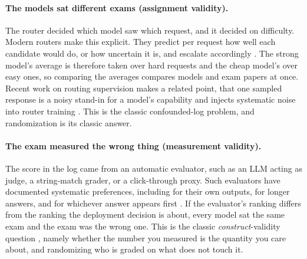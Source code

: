 \documentclass{article}
\theoremstyle{plain}
\theoremstyle{remark}
\begin{document}
\paragraph{The models sat different exams (assignment validity).} The router decided which model saw
which request, and it decided on difficulty. Modern routers make this explicit. They predict per
request how well each candidate would do, or how uncertain it is, and escalate accordingly
\citep{feng2025graphrouter,zhang2025routerr1,su2026cprouter,zheng2026disrouter}. The strong model's
average is therefore taken over hard requests and the cheap model's over easy ones, so comparing the
averages compares models and exam papers at once. Recent work on routing supervision makes a related
point, that one sampled response is a noisy stand-in for a model's capability and injects systematic
noise into router training \citep{routing2026supervision}. This is the classic confounded-log
problem, and randomization is its classic answer.

\paragraph{The exam measured the wrong thing (measurement validity).} The score in the log came from
an automatic evaluator, such as an LLM acting as judge, a string-match grader, or a click-through
proxy. Such evaluators have documented systematic preferences, including for their own outputs, for
longer answers, and for whichever answer appears first
\citep{wang2024notfair,panickssery2024selfpreference,zheng2023judging}. If the
evaluator's ranking differs from the ranking the deployment decision is about, every model sat the
same exam and the exam was the wrong one. This is the classic \emph{construct}-validity question
\citep{jacobs2021measurement,raji2021everything}, namely whether the number you measured is the
quantity you care about, and randomizing who is graded on what does not touch it.
\end{document}
